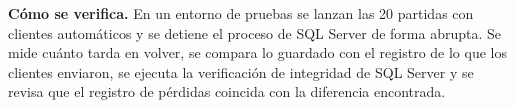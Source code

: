 \textbf{Cómo se verifica.} En un entorno de pruebas se lanzan las 20 partidas con clientes automáticos y se detiene el proceso de SQL Server de forma abrupta. Se mide cuánto tarda en volver, se compara lo guardado con el registro de lo que los clientes enviaron, se ejecuta la verificación de integridad de SQL Server y se revisa que el registro de pérdidas coincida con la diferencia encontrada.
